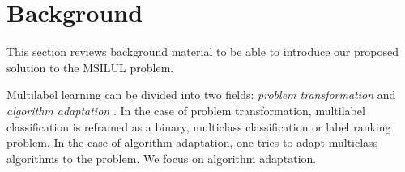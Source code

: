 
\section{Background}
\label{sec:org8c910ea}

This section reviews background material to be able to introduce our proposed solution to the MSILUL problem.


Multilabel learning can be divided into two fields: \emph{problem transformation} and \emph{algorithm adaptation} \cite{multilabelReview}. In the case of problem transformation, multilabel classification is reframed as a binary, multiclass classification or label ranking problem. In the case of algorithm adaptation, one tries to adapt multiclass algorithms to the problem. We focus on algorithm adaptation. 

